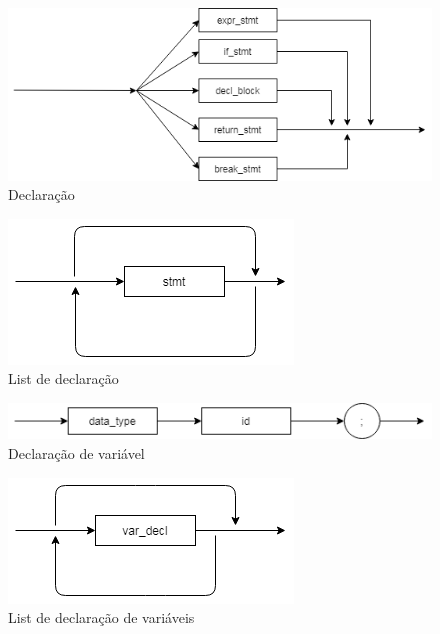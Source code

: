 \documentclass[]{article}
\numberwithin{equation}{section}
\begin{document}
\begin{center}
\begin{figure}[h!]
  \includegraphics[width=\linewidth]{./assets/stmt.png}
  \caption{Declaração}
\end{figure}
\end{center}

\begin{center}
\begin{figure}[h!]
  \includegraphics[width=\linewidth]{./assets/stmt_list.png}
  \caption{List de declaração}
\end{figure}
\end{center}

\begin{center}
\begin{figure}[h!]
  \includegraphics[width=\linewidth]{./assets/var_decl.png}
  \caption{Declaração de variável}
\end{figure}
\end{center}

\begin{center}
\begin{figure}[h!]
  \includegraphics[width=\linewidth]{./assets/var_decl_list.png}
  \caption{List de declaração de variáveis}
\end{figure}
\end{center}
\end{document}
